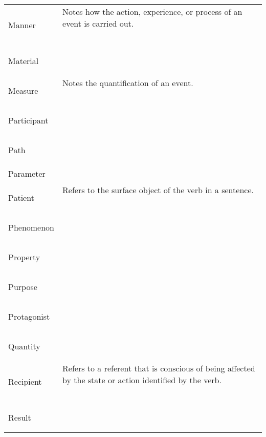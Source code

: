 \documentclass[a4paper,11pt, onecolumn,twoside]{article}
\begin{document}
\begin{longtable}{ p{}  p{} }
\midrule
 \multirow{2}{*}{Manner} & Notes how the action, experience, or process of an event is carried out. \\ 
        & ~ \\
\midrule
 \multirow{2}{*}{Material} & ~ \\ 
        & ~ \\
\midrule
 \multirow{2}{*}{Measure} & Notes the quantification of an event. \\ 
        & ~ \\
\midrule
 \multirow{2}{*}{Participant} & ~ \\ 
        & ~ \\
\midrule
 \multirow{2}{*}{Path} & ~ \\ 
        & ~ \\
\midrule
 \multirow{2}{*}{Parameter} & \\
        & ~ \\
\midrule
 \multirow{2}{*}{Patient} & Refers to the surface object of the verb in a sentence. \\ 
        & ~ \\
\midrule
 \multirow{2}{*}{Phenomenon} & ~ \\  %
        & ~ \\
\midrule
 \multirow{2}{*}{Property} & ~ \\ 
        & ~ \\
\midrule
 \multirow{2}{*}{Purpose} & ~ \\ 
        & ~ \\
\midrule
 \multirow{2}{*}{Protagonist} & ~ \\ %
        & ~ \\
\midrule
 \multirow{2}{*}{Quantity} & ~ \\  %
        & ~ \\
\midrule
 \multirow{2}{*}{Recipient} & Refers to a referent that is conscious of being affected by the state or action identified by the verb. \\ 
        & ~ \\
\midrule
 \multirow{2}{*}{Result} & ~ \\ 
        & ~ \\

\end{longtable}
\end{document}
